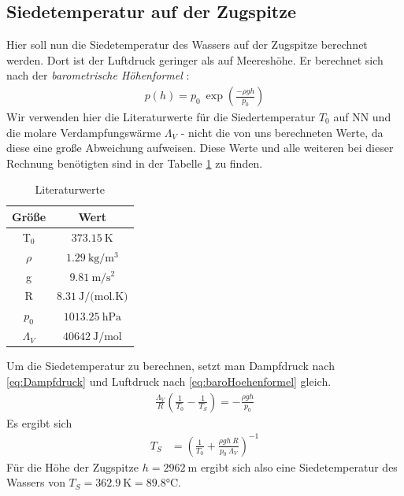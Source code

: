 \documentclass[12pt,a4paper,titlepage,headinclude,bibtotoc]{scrartcl}
\begin{document}
\subsection{Siedetemperatur auf der Zugspitze}
Hier soll nun die Siedetemperatur des Wassers auf der Zugspitze berechnet werden.
Dort ist der Luftdruck geringer als auf Meereshöhe.
Er berechnet sich nach der \textit{barometrische Höhenformel} \cite[S. 107]{gerthsen}:
\begin{align}
 p(h)=p_0~\exp{\left(\frac{-\rho g h}{p_0}\right)}
 \label{eq:baroHoehenformel}
\end{align}
Wir verwenden hier die Literaturwerte für die Siedertemperatur $T_0$ auf NN und die molare Verdampfungswärme $\Lambda_V$  - nicht die von uns berechneten Werte, da diese eine große Abweichung aufweisen.
Diese Werte und alle weiteren bei dieser Rechnung benötigten sind in der Tabelle \ref{tab:litW} zu finden.
\begin{table}[!htb]
 \centering
 \begin{tabular}{|c|c|}
  \hline
  Größe & Wert\\
  \hline
  T$_0$ & $373.15~\si{\kelvin}$\\
  $\rho$ & $1.29~\si{\kilo \gram/\meter^3}$\\
  g & $9.81~\si{\meter/\second^2}$\\
  R & $8.31~\si{\joule/(\mol.\kelvin)}$\\
  $p_0$ & $1013.25~\si{\hecto \pascal}$\\
  $\Lambda_V$ & $40642 ~\si{\joule/\mol}$\\
  \hline
 \end{tabular}
 \caption{Literaturwerte}
 \label{tab:litW}
\end{table}
Um die Siedetemperatur zu berechnen, setzt man Dampfdruck nach \eqref{eq:Dampfdruck} und Luftdruck nach \eqref{eq:baroHoehenformel} gleich.
\begin{align*}
 \frac{\Lambda_V}{R}\left(\frac{1}{T_0}-\frac{1}{T_S}\right)=-\frac{\rho g h}{p_0}
\end{align*}
Es ergibt sich
\begin{align}
 T_S &= \left(\frac{1}{T_0}+\frac{\rho g h~R}{p_0~\Lambda_V}\right)^{-1}
\end{align}
Für die Höhe der Zugspitze $h=2962~\si{\meter}$ ergibt sich also eine Siedetemperatur des Wassers von $T_S=362.9~\si{\kelvin}=89.8\si{\celsius}$.
\end{document}
